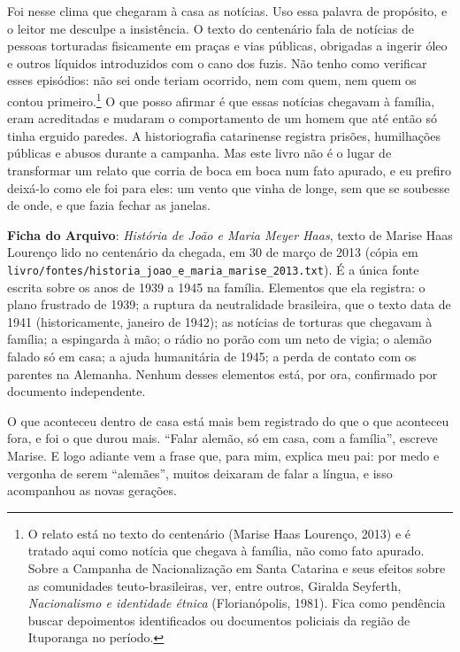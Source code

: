 \documentclass[
  brazilian,
  11pt,
  openany]{book}
\begin{document}
Foi nesse clima que chegaram à casa as notícias. Uso essa palavra de
propósito, e o leitor me desculpe a insistência. O texto do centenário
fala de notícias de pessoas torturadas fisicamente em praças e vias
públicas, obrigadas a ingerir óleo e outros líquidos introduzidos com o
cano dos fuzis. Não tenho como verificar esses episódios: não sei onde
teriam ocorrido, nem com quem, nem quem os contou primeiro.\footnote{O
  relato está no texto do centenário (Marise Haas Lourenço, 2013) e é
  tratado aqui como notícia que chegava à família, não como fato
  apurado. Sobre a Campanha de Nacionalização em Santa Catarina e seus
  efeitos sobre as comunidades teuto-brasileiras, ver, entre outros,
  Giralda Seyferth, \emph{Nacionalismo e identidade étnica}
  (Florianópolis, 1981). Fica como pendência buscar depoimentos
  identificados ou documentos policiais da região de Ituporanga no
  período.} O que posso afirmar é que essas notícias chegavam à família,
eram acreditadas e mudaram o comportamento de um homem que até então só
tinha erguido paredes. A historiografia catarinense registra prisões,
humilhações públicas e abusos durante a campanha. Mas este livro não é o
lugar de transformar um relato que corria de boca em boca num fato
apurado, e eu prefiro deixá-lo como ele foi para eles: um vento que
vinha de longe, sem que se soubesse de onde, e que fazia fechar as
janelas.

\begin{ficha}

\textbf{Ficha do Arquivo}: \emph{História de João e Maria Meyer Haas},
texto de Marise Haas Lourenço lido no centenário da chegada, em 30 de
março de 2013 (cópia em
\texttt{livro/fontes/historia\_joao\_e\_maria\_marise\_2013.txt}). É a
única fonte escrita sobre os anos de 1939 a 1945 na família. Elementos
que ela registra: o plano frustrado de 1939; a ruptura da neutralidade
brasileira, que o texto data de 1941 (historicamente, janeiro de 1942);
as notícias de torturas que chegavam à família; a espingarda à mão; o
rádio no porão com um neto de vigia; o alemão falado só em casa; a ajuda
humanitária de 1945; a perda de contato com os parentes na Alemanha.
Nenhum desses elementos está, por ora, confirmado por documento
independente.

\end{ficha}

O que aconteceu dentro de casa está mais bem registrado do que o que
aconteceu fora, e foi o que durou mais. ``Falar alemão, só em casa, com
a família'', escreve Marise. E logo adiante vem a frase que, para mim,
explica meu pai: por medo e vergonha de serem ``alemães'', muitos
deixaram de falar a língua, e isso acompanhou as novas gerações.
\end{document}
